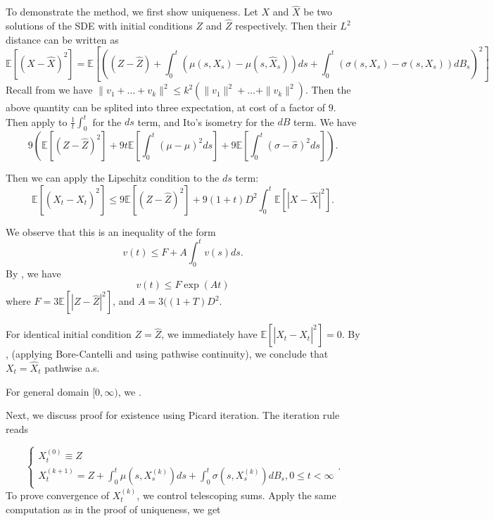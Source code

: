 To demonstrate the method, we first show uniqueness. Let $X$ and $\hat X$ be two solutions of the SDE with initial conditions $Z$ and $\hat Z$ respectively. Then their $L^2$ distance can be written as
\[
    \mathbb{E}\left[ \left( X - \hat{X}  \right) ^2 \right] = \mathbb{E}\left[ \left(  (Z - \hat{Z} ) + \int _0^t \left( \mu(s, X_s) - \mu(s, \hat{X} _s) \right) ds + \int _0^t \left( \sigma(s, X_s) - \sigma(s, X_s) \right)   d B_s \right) ^2 \right]
\]
Recall from  we have $\|v_1 + \ldots + v_k\|^2 \le k^2 \left( \|v_1\|^2 + \ldots + \|v_k\|^2 \right) $. Then the above quantity can be splited into three expectation, at cost of a factor of $9$. Then apply  to $\frac{1}{t} \int_0^t$ for the $ds$ term, and Ito's isometry for the $dB$ term. We have
\[
	9\left( \mathbb{E}\left[ (Z - \hat{Z} )^2 \right]  + 9 t \mathbb{E}\left[ \int _0^t (\mu - \hat{\mu} )^2 ds  \right] + 9 \mathbb{E}\left[ \int _0^t (\sigma - \hat{\sigma} )^2 ds \right]  \right) 
.\] 

Then we can apply the Lipschitz condition to the $ds$ term:
\[
	\mathbb{E}\left[ (X_t - \hat{X} _t)^2 \right] 
	\le 9 \mathbb{E}\left[ (Z - \hat{Z} )^2 \right] 
	+ 9 (1 + t) D^2 \int _0^t \mathbb{E}\left[ |X - \hat{X} |^2 \right] 
.\] 

We observe that this is an inequality of the form
\[
	v(t) \leq F + A \int _0^t v(s) ds
.\] 
By , we have
\[
	v(t) \le F \exp(At)
\] 
where $F = 3 \mathbb{E}\left[ |Z - \hat{Z} |^2 \right] $, and $A = 3 ((1 + T) D^2$.

For identical initial condition $Z = \hat{Z} $, we immediately have $\mathbb{E}\left[ |X_t - \hat{X} _t|^2 \right]  = 0$. By , (applying Bore-Cantelli and using pathwise continuity), we conclude that $X_t = \hat{X} _t$ pathwise a.s.

For general domain $[0,\infty )$, we .

Next, we discuss proof for existence using Picard iteration. The iteration rule reads

\[
	\begin{cases}
		X_t^{(0)} \equiv Z \\
		X_t^{(k+1)} = Z + \int _0^t \mu\left( s, X_s^{(k)} \right) d s + \int _0^t \sigma(s, X_s^{(k)}) d B_s, 0 \le t < \infty 
	\end{cases}
.\] 
To prove convergence of $X_t^{(k)}$, we control telescoping sums. Apply the same computation as in the proof of uniqueness, we get

